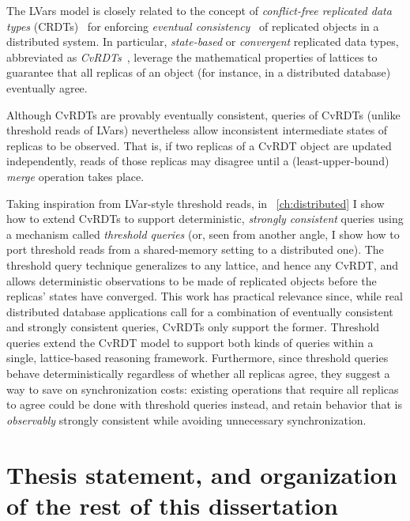 The LVars model is closely related to the concept of
\emph{conflict-free replicated data types} (CRDTs)~\cite{crdts} for
enforcing \emph{eventual consistency}~\cite{vogels-ec} of replicated
objects in a distributed system.  In particular, \emph{state-based} or
\emph{convergent} replicated data types, abbreviated as
\emph{CvRDTs}~\cite{crdts, crdts-tr}, leverage the mathematical
properties of lattices to guarantee that all replicas of an object
(for instance, in a distributed database) eventually agree.

Although CvRDTs are provably eventually consistent, queries of CvRDTs
(unlike threshold reads of LVars) nevertheless allow inconsistent
intermediate states of replicas to be observed.  That is, if two
replicas of a CvRDT object are updated independently, reads of those
replicas may disagree until a (least-upper-bound) \emph{merge}
operation takes place.

Taking inspiration from LVar-style threshold reads, in
~\ref{ch:distributed} I show how to extend CvRDTs to support
deterministic, \emph{strongly consistent} queries using a mechanism
called \emph{threshold queries} (or, seen from another angle, I show
how to port threshold reads from a shared-memory setting to a
distributed one).  The threshold query technique generalizes to any
lattice, and hence any CvRDT, and allows deterministic observations to
be made of replicated objects before the replicas' states have
converged.  This work has practical relevance since, while real
distributed database applications call for a combination of eventually
consistent and strongly consistent queries, CvRDTs only support the
former.  Threshold queries extend the CvRDT model to support both
kinds of queries within a single, lattice-based reasoning framework.
Furthermore, since threshold queries behave deterministically
regardless of whether all replicas agree, they suggest a way to save
on synchronization costs: existing operations that require all
replicas to agree could be done with threshold queries instead, and
retain behavior that is \emph{observably} strongly consistent while
avoiding unnecessary synchronization.
\fi

\ifdefined\DISSERTATION
\section{Thesis statement, and organization of the rest of this dissertation}\label{s:intro-thesis}

